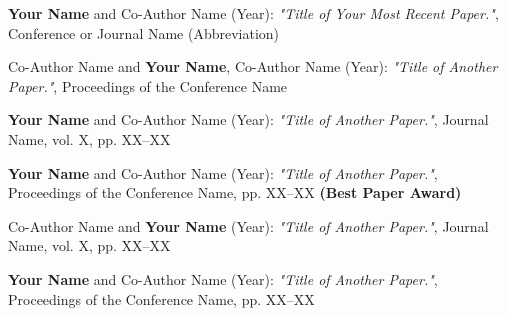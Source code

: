 \begin{publications}
  \item {\textbf{Your Name} and Co-Author Name (Year): \textit{"Title of Your Most Recent Paper."}, Conference or Journal Name (Abbreviation) }

  \item {Co-Author Name and \textbf{Your Name}, Co-Author Name (Year): \textit{"Title of Another Paper."}, Proceedings of the Conference Name }

  \item {\textbf{Your Name} and Co-Author Name (Year): \textit{"Title of Another Paper."}, Journal Name, vol. X, pp. XX--XX }

  \item {\textbf{Your Name} and Co-Author Name (Year): \textit{"Title of Another Paper."}, Proceedings of the Conference Name, pp. XX--XX \textbf{(Best Paper Award)}}

  \item {Co-Author Name and \textbf{Your Name} (Year): \textit{"Title of Another Paper."}, Journal Name, vol. X, pp. XX--XX}

  \item {\textbf{Your Name} and Co-Author Name (Year): \textit{"Title of Another Paper."}, Proceedings of the Conference Name, pp. XX--XX}
\end{publications}

